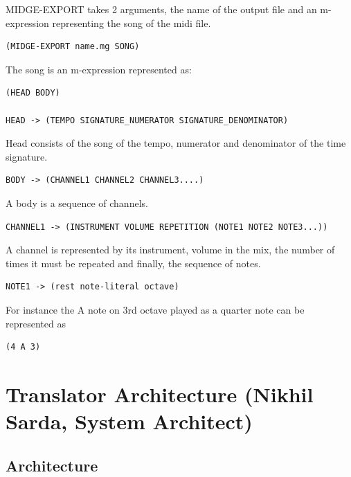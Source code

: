 \documentclass[letterpaper,11pt]{article}
\begin{document}
{MIDGE-EXPORT takes 2 arguments, the name of the output file and an m-expression representing the song of the midi file. 

\lstset{breaklines=true,language=Lisp}
\begin{lstlisting}
(MIDGE-EXPORT name.mg SONG)
\end{lstlisting}
The song is an m-expression represented as:

\lstset{breaklines=true,language=Lisp}
\begin{lstlisting}
(HEAD BODY)

HEAD -> (TEMPO SIGNATURE_NUMERATOR SIGNATURE_DENOMINATOR)
\end{lstlisting}

Head consists of the song of the tempo, numerator and denominator of the time signature.

\lstset{breaklines=true,language=Lisp}
\begin{lstlisting}
BODY -> (CHANNEL1 CHANNEL2 CHANNEL3....)

\end{lstlisting}
A body is a sequence of channels.

\lstset{breaklines=true,language=Lisp}
\begin{lstlisting}
CHANNEL1 -> (INSTRUMENT VOLUME REPETITION (NOTE1 NOTE2 NOTE3...))

\end{lstlisting}
A channel is represented by its instrument, volume in the mix, the number of times it must be repeated and finally, the sequence of notes.

\lstset{breaklines=true,language=Lisp}
\begin{lstlisting}
NOTE1 -> (rest note-literal octave)

\end{lstlisting}
For instance the A note on 3rd octave played as a quarter note can be
represented as

\lstset{breaklines=true,language=Lisp}
\begin{lstlisting}
(4 A 3)
\end{lstlisting}

\section{Translator Architecture (Nikhil Sarda, System Architect)}
\subsection{Architecture}

}
\end{document}
